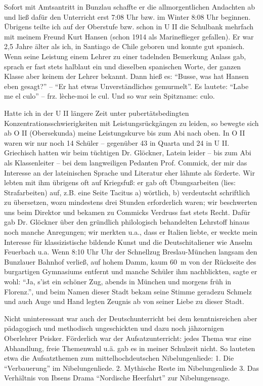 \documentclass[a5paper,pagesize,10pt,twoside=true]{scrbook}
\renewcommand{\marginpar}[2][]{}
\begin{document}
Sofort mit Amtsantritt in Bunzlau schaffte er die allmorgentlichen Andachten ab und ließ dafür den Unterricht erst 7:08 Uhr bzw. im Winter 8:08 Uhr beginnen. Übrigens teilte ich auf der Oberstufe bzw. schon in U II die Schulbank mehrfach mit meinem Freund Kurt Hansen (schon 1914 als Marineflieger gefallen). Er war 2,5 Jahre älter als ich, in Santiago de Chile geboren und konnte gut spanisch. Wenn seine Leistung einem Lehrer zu einer tadelnden Bemerkung Anlass gab, sprach er fast stets halblaut ein und dieselben spanischen Worte, der ganzen Klasse aber keinem der Lehrer bekannt. Dann hieß es: \enquote{Busse, was hat Hansen eben gesagt?} -- \enquote{Er hat etwas Unverständliches gemurmelt}. Es lautete: \enquote{Labe me el culo} -- frz. lèche-moi le cul. Und so war sein Spitzname: culo.

\marginpar{64}
Hatte ich in der U II längere Zeit unter pubertätsbedingten Konzentrationsschwierigkeiten mit Leistungsrückgängen zu leiden, so bewegte sich ab O II (Obersekunda) meine Leistungskurve bis zum Abi nach oben. In O II waren wir nur noch 14 Schüler -- gegenüber 43 in Quarta und 24 in U II. Griechisch hatten wir beim tüchtigen Dr. Glöckner, Latein leider -- bis zum Abi als Klassenleiter -- bei dem langweiligen Pedanten Prof. Commick, der mir das Interesse an der lateinischen Sprache und Literatur eher lähmte als förderte. Wir lebten mit ihm übrigens oft auf Kriegsfuß: er gab oft Übungsarbeiten (lies: Strafarbeiten) auf, z.B. eine Seite Tacitus a) wörtlich, b) verdeutscht schriftlich zu übersetzen, wozu mindestens drei Stunden erforderlich waren; wir beschwerten uns beim Direktor und bekamen zu Commicks Verdruss fast stets Recht. Dafür gab Dr. Glöckner über den gründlich philologisch behandelten Lehrstoff hinaus noch manche Anregungen; wir merkten u.a., dass er Italien liebte, er weckte mein Interesse für klassizistische bildende Kunst und die Deutschitaliener wie Anselm Feuerbach u.a. Wenn 8:10 Uhr Uhr der Schnellzug Breslau-München langsam den Bunzlauer Bahnhof verließ, auf hohem Damm, kaum 60~m von der Rückseite des burgartigen Gymnasiums entfernt und manche Schüler ihm nachblickten, sagte er wohl: \enquote{Ja, s'ist ein schöner Zug, abends in München und morgens früh in Florenz.}, und beim Namen dieser Stadt bekam seine Stimme geradezu Schmelz und auch Auge und Hand legten Zeugnis ab von seiner Liebe zu dieser Stadt.

Nicht uninteressant war auch der Deutschunterricht bei dem kenntnisreichen aber pädagogisch und methodisch ungeschickten und dazu noch jähzornigen Oberlehrer Peisker. Förderlich war der Aufsatzunterricht: jedes Thema war eine Abhandlung, freie Themenwahl u.ä. gab es in meiner Schulzeit nicht. So lauteten etwa die Aufsatzthemen zum mittelhochdeutschen Nibelungenliede: 1. Die \enquote{Verbauerung} im Nibelungenliede. 2. Mythische Reste im Nibelungenliede 3. Das Verhältnis von Ibsens Drama \enquote{Nordische Heerfahrt} zur Nibelungensage.
\end{document}
